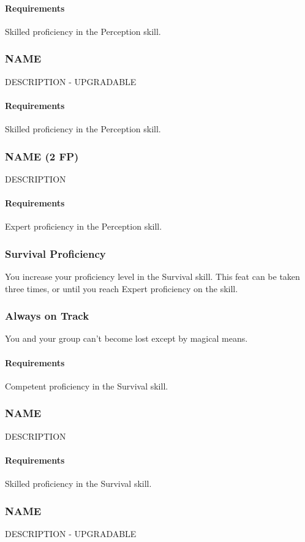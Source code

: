    \paragraph{Requirements} Skilled proficiency in the Perception skill.
\subsubsection{NAME} \label{feat::name}
    DESCRIPTION - UPGRADABLE
    \paragraph{Requirements} Skilled proficiency in the Perception skill.
\subsubsection{NAME (2 FP)} \label{feat::name}
    DESCRIPTION
    \paragraph{Requirements} Expert proficiency in the Perception skill.
\subsubsection{Survival Proficiency} \label{feat::survivalprof}
    You increase your proficiency level in the Survival skill.
    This feat can be taken three times, or until you reach Expert proficiency on the skill.
\subsubsection{Always on Track} \label{feat::alwaysontrack}
    You and your group can't become lost except by magical means.
    \paragraph{Requirements} Competent proficiency in the Survival skill.
\subsubsection{NAME} \label{feat::name}
    DESCRIPTION
    \paragraph{Requirements} Skilled proficiency in the Survival skill.
\subsubsection{NAME} \label{feat::name}
    DESCRIPTION - UPGRADABLE

